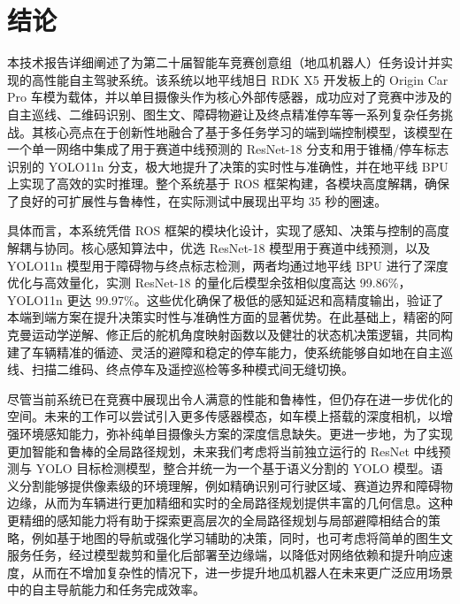 \documentclass[UTF8]{ctexart}
\begin{document}
\section{结论}
本技术报告详细阐述了为第二十届智能车竞赛创意组（地瓜机器人）任务设计并实现的高性能自主驾驶系统。该系统以地平线旭日 RDK X5 开发板上的 Origin Car Pro 车模为载体，并以单目摄像头作为核心外部传感器，成功应对了竞赛中涉及的自主巡线、二维码识别、图生文、障碍物避让及终点精准停车等一系列复杂任务挑战。其核心亮点在于创新性地融合了基于多任务学习的端到端控制模型，该模型在一个单一网络中集成了用于赛道中线预测的 ResNet-18 分支和用于锥桶/停车标志识别的 YOLO11n 分支，极大地提升了决策的实时性与准确性，并在地平线 BPU 上实现了高效的实时推理。整个系统基于 ROS 框架构建，各模块高度解耦，确保了良好的可扩展性与鲁棒性，在实际测试中展现出平均 35 秒的圈速。

具体而言，本系统凭借 ROS 框架的模块化设计，实现了感知、决策与控制的高度解耦与协同。核心感知算法中，优选 ResNet-18 模型用于赛道中线预测，以及 YOLO11n 模型用于障碍物与终点标志检测，两者均通过地平线 BPU 进行了深度优化与高效量化，实测 ResNet-18 的量化后模型余弦相似度高达 99.86\%，YOLO11n 更达 99.97\%。这些优化确保了极低的感知延迟和高精度输出，验证了本端到端方案在提升决策实时性与准确性方面的显著优势。在此基础上，精密的阿克曼运动学逆解、修正后的舵机角度映射函数以及健壮的状态机决策逻辑，共同构建了车辆精准的循迹、灵活的避障和稳定的停车能力，使系统能够自如地在自主巡线、扫描二维码、终点停车及遥控巡检等多种模式间无缝切换。

尽管当前系统已在竞赛中展现出令人满意的性能和鲁棒性，但仍存在进一步优化的空间。未来的工作可以尝试引入更多传感器模态，如车模上搭载的深度相机，以增强环境感知能力，弥补纯单目摄像头方案的深度信息缺失。更进一步地，为了实现更加智能和鲁棒的全局路径规划，未来我们考虑将当前独立运行的 ResNet 中线预测与 YOLO 目标检测模型，整合并统一为一个基于语义分割的 YOLO 模型。语义分割能够提供像素级的环境理解，例如精确识别可行驶区域、赛道边界和障碍物边缘，从而为车辆进行更加精细和实时的全局路径规划提供丰富的几何信息。这种更精细的感知能力将有助于探索更高层次的全局路径规划与局部避障相结合的策略，例如基于地图的导航或强化学习辅助的决策，同时，也可考虑将简单的图生文服务任务，经过模型裁剪和量化后部署至边缘端，以降低对网络依赖和提升响应速度，从而在不增加复杂性的情况下，进一步提升地瓜机器人在未来更广泛应用场景中的自主导航能力和任务完成效率。

\newpage

\printbibliography
\end{document}
